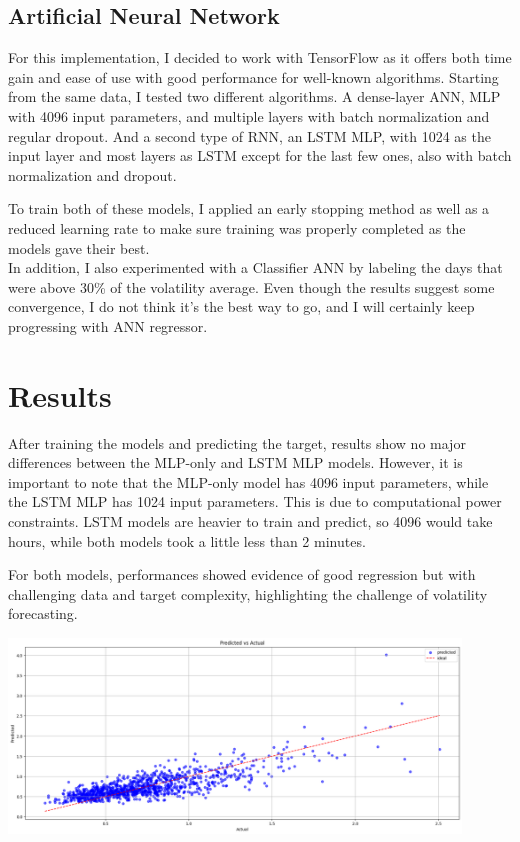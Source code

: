 \documentclass[letterpaper,11pt]{article}
\begin{document}
\subsection{Artificial Neural Network}

For this implementation, I decided to work with TensorFlow as it offers both time gain and ease of use with good performance for well-known algorithms.  
Starting from the same data, I tested two different algorithms. A dense-layer ANN, MLP with 4096 input parameters, and multiple layers with batch normalization and regular dropout. And a second type of RNN, an LSTM MLP, with 1024 as the input layer and most layers as LSTM except for the last few ones, also with batch normalization and dropout.

To train both of these models, I applied an early stopping method as well as a reduced learning rate to make sure training was properly completed as the models gave their best.\\

In addition, I also experimented with a Classifier ANN by labeling the days that were above 30\% of the volatility average. Even though the results suggest some convergence, I do not think it’s the best way to go, and I will certainly keep progressing with ANN regressor.

\section{Results}

After training the models and predicting the target, results show no major differences between the MLP-only and LSTM MLP models. However, it is important to note that the MLP-only model has 4096 input parameters, while the LSTM MLP has 1024 input parameters. This is due to computational power constraints. LSTM models are heavier to train and predict, so 4096 would take hours, while both models took a little less than 2 minutes.

For both models, performances showed evidence of good regression but with challenging data and target complexity, highlighting the challenge of volatility forecasting.

\begin{center}
\includegraphics[width=0.9\textwidth]{img/PVA_R.png}
\end{center}
\end{document}
